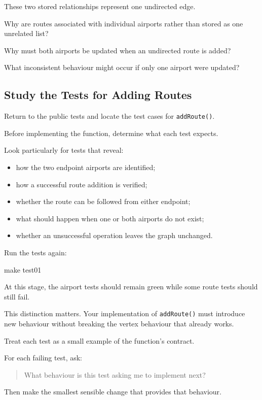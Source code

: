 \documentclass{csc2059practical}
\begin{document}
These two stored relationships represent one undirected edge.

\begin{reflectionbox}
Why are routes associated with individual airports rather than stored as one
unrelated list?

Why must both airports be updated when an undirected route is added?

What inconsistent behaviour might occur if only one airport were updated?
\end{reflectionbox}


\subsection{Study the Tests for Adding Routes}

Return to the public tests and locate the test cases for
\texttt{addRoute()}.

Before implementing the function, determine what each test expects.

Look particularly for tests that reveal:

\begin{itemize}
\item how the two endpoint airports are identified;
\item how a successful route addition is verified;
\item whether the route can be followed from either endpoint;
\item what should happen when one or both airports do not exist;
\item whether an unsuccessful operation leaves the graph unchanged.
\end{itemize}

Run the tests again:

\begin{terminal}
make test01
\end{terminal}

At this stage, the airport tests should remain green while some route tests
should still fail.

This distinction matters. Your implementation of \texttt{addRoute()}
must introduce new behaviour without breaking the vertex behaviour that already
works.

\begin{tipbox}
Treat each test as a small example of the function’s contract.

For each failing test, ask:

\begin{quote}
What behaviour is this test asking me to implement next?
\end{quote}

Then make the smallest sensible change that provides that behaviour.
\end{tipbox}
\end{document}
